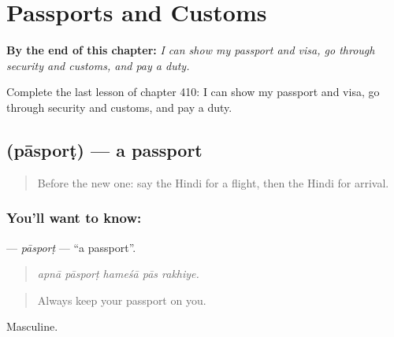 
\chapter{Passports and Customs}
\label{ch:hi-passports-and-customs}

\begin{chapteropening}
\textbf{By the end of this chapter:} \emph{I can show my passport and visa, go through security and customs, and pay a duty.}

Complete the last lesson of chapter 410: I can show my passport and visa, go through security and customs, and pay a duty.
\end{chapteropening}

\section[\texorpdfstring{\hi{पासपोर्ट} (pāsporṭ)}{पासपोर्ट (pāsporṭ)}]{ (pāsporṭ) — a passport}

\label{lesson:HI-C410-pasport}



\begin{quote}
Before the new one: say the Hindi for a flight, then the Hindi for arrival.
\end{quote}

\subsection*{You'll want to know: }
\textbf{} — \emph{pāsporṭ} — \textquotedblleft{}a passport\textquotedblright{}.

\begin{quote}
    
\end{quote}

\begin{quote}
\emph{apnā pāsporṭ hameśā pās rakhiye.}
\end{quote}

\begin{quote}
Always keep your passport on you.
\end{quote}

Masculine.

